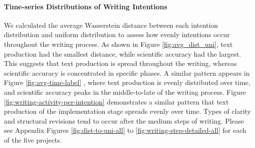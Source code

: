 
\paragraph{Time-series Distributions of Writing Intentions} 

We calculated the average Wasserstein distance between each intention distribution and uniform distribution to assess how evenly intentions occur throughout the writing process. As shown in Figure \ref{fig:avg_dist_uni}, text production had the smallest distance, while scientific accuracy had the largest. This suggests that text production is spread throughout the writing, whereas scientific accuracy is concentrated in specific phases. A similar pattern appears in Figure \ref{fig:avg-time-label} , where text production is evenly distributed over time, and scientific accuracy peaks in the middle-to-late of the writing process. 
Figure \ref{fig:writing-activity-per-intention} demonstrates a similar pattern that text production of the implementation stage spreads evenly over time. 
Types of clarity and structural revisions tend to occur after the medium steps of writing. Please see Appendix Figures \ref{fig:dist-to-uni-all} to \ref{fig:writing-step-detailed-all} for each of the five projects.










